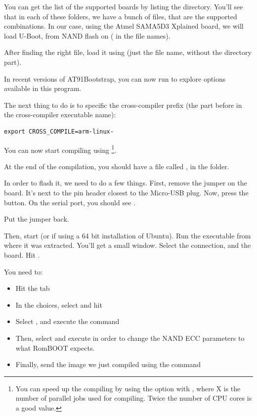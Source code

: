 You can get the list of the supported boards by listing the
 directory. You'll see that in each of these folders, we
have a bunch of  files, that are the supported
combinations. In our case, using the Atmel SAMA5D3 Xplained
board, we will load U-Boot, from NAND flash on
( in the  file names).

After finding the right  file, load it using
 (just the file name, without
the directory part).

In recent versions of AT91Bootstrap, you can now run  to explore options available in this program. 

The next thing to do is to specific the cross-compiler prefix
(the part before  in the cross-compiler executable name):

\begin{verbatim}
export CROSS_COMPILE=arm-linux-
\end{verbatim}

You can now start compiling using \footnote{You can
speed up the compiling by using the  option with
, where X is the number of parallel jobs used for
compiling. Twice the number of CPU cores is a good value.}.

At the end of the compilation, you should have a file called
, in the
 folder.

In order to flash it, we need to do a few things. First, remove the
 jumper on the board. It's next to the pin header
closest to the Micro-USB plug. Now, press the  button.
On the serial port, you should see .

Put the jumper back.

Then, start  (or  if using a 64 bit
installation of Ubuntu). Run the executable from where it was
extracted. You'll get a small window. Select the 
connection, and the  board. Hit
.

You need to:
\begin{itemize}
\item Hit the  tab
\item In the  choices, select 
      and hit 
\item Select , and execute the command
\item Then, select and execute 
  in order to change the NAND ECC parameters to what RomBOOT expects.
\item Finally, send the image we just compiled using the command
\end{itemize}

